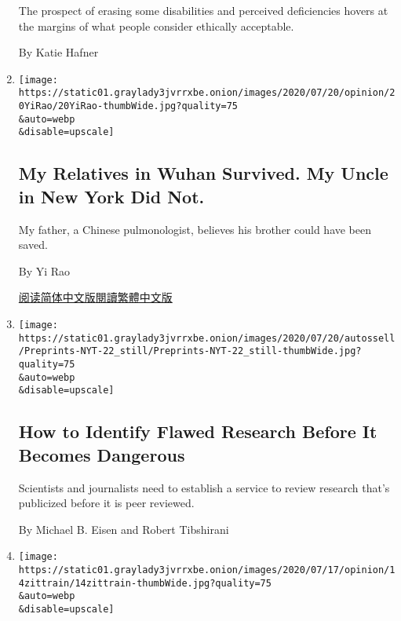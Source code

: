 \begin{enumerate}
  The prospect of erasing some disabilities and perceived deficiencies
  hovers at the margins of what people consider ethically acceptable.

  By Katie Hafner
\item
  \href{/2020/07/22/opinion/coronavirus-china-us.html}{}

  \texttt{[image: https://static01.graylady3jvrrxbe.onion/images/2020/07/20/opinion/20YiRao/20YiRao-thumbWide.jpg?quality=75\\\&auto=webp\\\&disable=upscale]}

  \hypertarget{my-relatives-in-wuhan-survived-my-uncle-in-new-york-did-not}{%
  \subsection{My Relatives in Wuhan Survived. My Uncle in New York Did
  Not.}\label{my-relatives-in-wuhan-survived-my-uncle-in-new-york-did-not}}

  My father, a Chinese pulmonologist, believes his brother could have
  been saved.

  By Yi Rao

  \href{https://cn.nytimes3xbfgragh.onion/opinion/20200723/coronavirus-china-us/}{阅读简体中文版}\href{https://cn.nytimes3xbfgragh.onion/opinion/20200723/coronavirus-china-us/zh-hant/}{閱讀繁體中文版}
\item
  \href{/2020/07/20/opinion/coronavirus-preprints.html}{}

  \texttt{[image: https://static01.graylady3jvrrxbe.onion/images/2020/07/20/autossell/Preprints-NYT-22\_still/Preprints-NYT-22\_still-thumbWide.jpg?quality=75\\\&auto=webp\\\&disable=upscale]}

  \hypertarget{how-to-identify-flawed-research-before-it-becomes-dangerous}{%
  \subsection{How to Identify Flawed Research Before It Becomes
  Dangerous}\label{how-to-identify-flawed-research-before-it-becomes-dangerous}}

  Scientists and journalists need to establish a service to review
  research that's publicized before it is peer reviewed.

  By Michael B. Eisen and Robert Tibshirani
\item
  \href{/2020/07/16/opinion/coronavirus-testing-us.html}{}

  \texttt{[image: https://static01.graylady3jvrrxbe.onion/images/2020/07/17/opinion/14zittrain/14zittrain-thumbWide.jpg?quality=75\\\&auto=webp\\\&disable=upscale]}


\end{enumerate}
